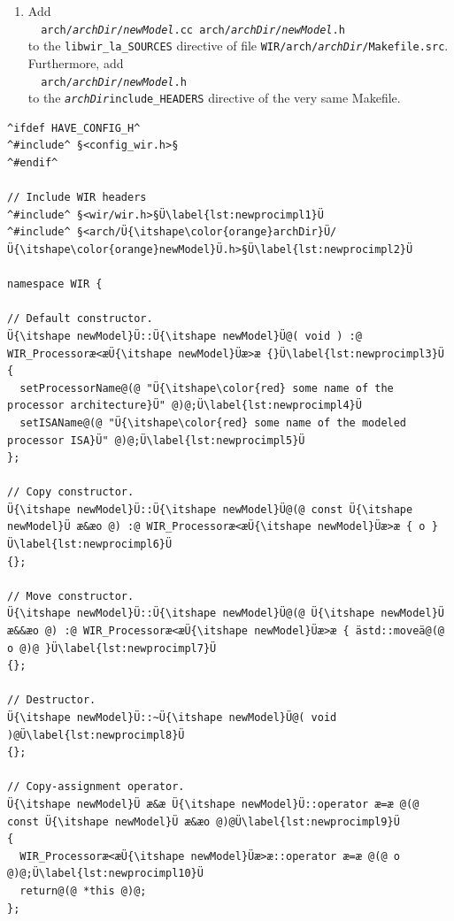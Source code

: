 \begin{enumerate}[resume]
  \item Add \\
  \verb|  arch/|\texttt{\itshape archDir}\verb|/|\texttt{\itshape newModel}\verb|.cc arch/|\texttt{\itshape archDir}\verb|/|\texttt{\itshape newModel}\verb|.h| \\
  to the \texttt{libwir\_la\_SOURCES} directive of file \texttt{WIR/arch/{\itshape archDir}/Makefile.src}.
  Furthermore, add \\
  \verb|  arch/|\texttt{\itshape archDir}\verb|/|\texttt{\itshape newModel}\verb|.h| \\
  to the \texttt{{\itshape archDir}include\_HEADERS} directive of the very same Makefile.
\end{enumerate}

\begin{lstlisting}[style=code,float=!t,caption={Rudimentary Implementation of a New Processor Model's Class},label=lst:newprocimpl]
^ifdef HAVE_CONFIG_H^
^#include^ §<config_wir.h>§
^#endif^

// Include WIR headers
^#include^ §<wir/wir.h>§Ü\label{lst:newprocimpl1}Ü
^#include^ §<arch/Ü{\itshape\color{orange}archDir}Ü/Ü{\itshape\color{orange}newModel}Ü.h>§Ü\label{lst:newprocimpl2}Ü

namespace WIR {

// Default constructor.
Ü{\itshape newModel}Ü::Ü{\itshape newModel}Ü@( void ) :@ WIR_Processoræ<æÜ{\itshape newModel}Üæ>æ {}Ü\label{lst:newprocimpl3}Ü
{
  setProcessorName@(@ "Ü{\itshape\color{red} some name of the processor architecture}Ü" @)@;Ü\label{lst:newprocimpl4}Ü
  setISAName@(@ "Ü{\itshape\color{red} some name of the modeled processor ISA}Ü" @)@;Ü\label{lst:newprocimpl5}Ü
};

// Copy constructor.
Ü{\itshape newModel}Ü::Ü{\itshape newModel}Ü@(@ const Ü{\itshape newModel}Ü æ&æo @) :@ WIR_Processoræ<æÜ{\itshape newModel}Üæ>æ { o }Ü\label{lst:newprocimpl6}Ü
{};

// Move constructor.
Ü{\itshape newModel}Ü::Ü{\itshape newModel}Ü@(@ Ü{\itshape newModel}Ü æ&&æo @) :@ WIR_Processoræ<æÜ{\itshape newModel}Üæ>æ { ästd::moveä@(@ o @)@ }Ü\label{lst:newprocimpl7}Ü
{};

// Destructor.
Ü{\itshape newModel}Ü::~Ü{\itshape newModel}Ü@( void )@Ü\label{lst:newprocimpl8}Ü
{};

// Copy-assignment operator.
Ü{\itshape newModel}Ü æ&æ Ü{\itshape newModel}Ü::operator æ=æ @(@ const Ü{\itshape newModel}Ü æ&æo @)@Ü\label{lst:newprocimpl9}Ü
{
  WIR_Processoræ<æÜ{\itshape newModel}Üæ>æ::operator æ=æ @(@ o @)@;Ü\label{lst:newprocimpl10}Ü
  return@(@ *this @)@;
};


\end{lstlisting}

